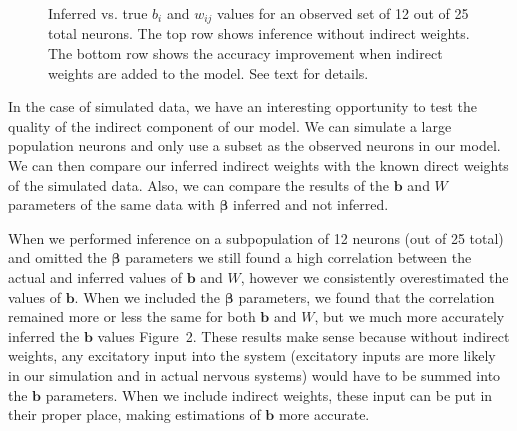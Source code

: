 \documentclass{article}
\begin{document}
\begin{figure}
{}
\caption{Inferred vs. true $b_i$ and $w_{ij}$ values for an observed set of 12 out of 25 total neurons. The top row shows inference without indirect weights. The bottom row shows the accuracy improvement when indirect weights are added to the model. See text for details.}
\end{figure}
In the case of simulated data, we have an interesting opportunity to test the quality of the indirect component of our model. We can simulate a large population neurons and only use a subset as the observed neurons in our model. We can then compare our inferred indirect weights with the known direct weights of the simulated data. Also, we can compare the results of the $\mathbf{b}$ and $W$ parameters of the same data with $\bm{\beta}$ inferred and not inferred.

When we performed inference on a subpopulation of 12 neurons (out of 25 total) and omitted the $\bm{\beta}$ parameters we still found a high correlation between the actual and inferred values of $\mathbf{b}$ and $W$, however we consistently overestimated the values of $\mathbf{b}$. When we included the $\bm{\beta}$ parameters, we found that the correlation remained more or less the same for both $\mathbf{b}$ and $W$, but we much more accurately inferred the $\mathbf{b}$ values Figure~2. These results make sense because without indirect weights, any excitatory input into the system (excitatory inputs are more likely in our simulation and in actual nervous systems) would have to be summed into the $\mathbf{b}$ parameters. When we include indirect weights, these input can be put in their proper place, making estimations of $\mathbf{b}$ more accurate. 
\end{document}

